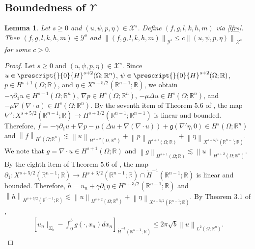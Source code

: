 \documentclass[11pt,letterpaper,reqno]{amsart}
\newtheorem{lemma}[theorem]{Lemma}
\numberwithin{equation}{section}
\newcommand{\norm}[1]{\left\lVert#1\right\rVert}
\begin{document}
\subsection{Boundedness of \(\Upsilon\)}
\begin{lemma} \label{upsilonbounded}
    Let \(s \geq 0\) and \((u,\psi,p,\eta) \in \mathcal{X}^{s}\). Define \((f,g,l,k,h,m)\) via \eqref{lfrs}. Then \((f,g,l,k,h,m) \in \mathcal{Y}^{s}\) and \(\norm{(f,g,l,k,h,m)}_{\mathcal{Y}^{s}} \leq c\norm{(u,\psi,p,\eta)}_{\mathcal{X}^{s}}\) for some \(c>0\).
\end{lemma}
\begin{proof}
    Let \(s \geq 0\) and \((u,\psi,p,\eta) \in \mathcal{X}^{s}\). Since \(u \in \prescript{}{0}{H}^{s+2}(\Omega;\mathbb{R}^{n})\), \(\psi \in \prescript{}{0}{H}^{s+2}(\Omega;\mathbb{R})\), \(p \in H^{s+1}(\Omega;\mathbb{R})\), and \(\eta \in X^{s+5/2}(\mathbb{R}^{n-1};\mathbb{R})\), we obtain \(-\gamma\partial_{1}u \in H^{s+1}(\Omega;\mathbb{R}^{n})\), \(\nabla p \in H^{s}(\Omega;\mathbb{R}^{n})\), \(-\mu\Delta u \in H^{s}(\Omega;\mathbb{R}^{n})\), and \(-\mu\nabla(\nabla \cdot u) \in H^{s}(\Omega;\mathbb{R}^{n})\). By the seventh item of Theorem \(5.6\) of \cite{leoni2023traveling}, the map \(\nabla':X^{s+5/2}(\mathbb{R}^{n-1};\mathbb{R}) \to H^{s+3/2}(\mathbb{R}^{n-1};\mathbb{R}^{n-1})\) is linear and bounded. Therefore, \(f=-\gamma\partial_{1}u+\nabla p-\mu(\Delta u+\nabla(\nabla \cdot u))+\mathfrak{g}(\nabla'\eta,0) \in H^{s}(\Omega;\mathbb{R}^{n})\) and \(\norm{f}_{H^{s}(\Omega;\mathbb{R}^{n})} \lesssim \norm{u}_{H^{s+2}(\Omega;\mathbb{R}^{n})}+\norm{p}_{H^{s+1}(\Omega;\mathbb{R})}+\norm{\eta}_{X^{s+5/2}(\mathbb{R}^{n-1};\mathbb{R})}\). We note that \(g = \nabla \cdot u \in H^{s+1}(\Omega;\mathbb{R})\) and \(\norm{g}_{H^{s+1}(\Omega;\mathbb{R})} \lesssim \norm{u}_{H^{s+2}(\Omega;\mathbb{R}^{n})}\). By the eighth item of Theorem \(5.6\) of \cite{leoni2023traveling}, the map \(\partial_{1}:X^{s+5/2}(\mathbb{R}^{n-1};\mathbb{R}) \to H^{s+3/2}(\mathbb{R}^{n-1};\mathbb{R})\cap\dot{H}^{-1}(\mathbb{R}^{n-1};\mathbb{R})\) is linear and bounded. Therefore, \(h=u_{n}+\gamma\partial_{1}\eta \in H^{s+3/2}(\mathbb{R}^{n-1};\mathbb{R})\) and \(\norm{h}_{H^{s+3/2}(\mathbb{R}^{n-1};\mathbb{R})} \lesssim \norm{u}_{H^{s+2}(\Omega;\mathbb{R}^{n})}+\norm{\eta}_{X^{s+5/2}(\mathbb{R}^{n-1};\mathbb{R})}\). By Theorem \(3.1\) of \cite{leoni2023traveling},
    \begin{align}
        \left[u_{n}\mid_{\Sigma_{b}}-\int_{0}^{b}g(\cdot,x_{n})dx_{n}\right]_{\dot{H}^{-1}(\mathbb{R}^{n-1};\mathbb{R})} \leq 2\pi\sqrt{b}\norm{u}_{L^{2}(\Omega;\mathbb{R}^{n})}.

\end{align}
\end{proof}
\end{document}
